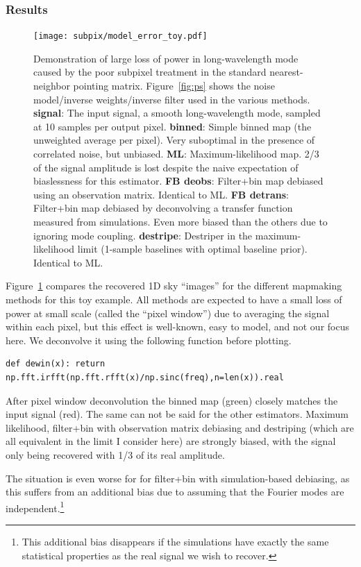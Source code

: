 \documentclass[twocolumn,apj]{aastex63}
\newcommand{\dfn}[1]{\textbf{#1}}
\begin{document}
\subsubsection{Results}
\begin{figure}
	\centering
	\texttt{[image: subpix/model\_error\_toy.pdf]}
	\caption{
		Demonstration of large loss of power in long-wavelength mode
		caused by the poor subpixel treatment in the standard nearest-neighbor pointing matrix.
		Figure~\ref{fig:ps} shows the noise model/inverse weights/inverse filter
		used in the various methods.
		\dfn{signal}: The input signal, a smooth long-wavelength mode,
		sampled at 10 samples per output pixel.
		\dfn{binned}: Simple binned map (the unweighted average per pixel).
		Very suboptimal in the presence of correlated noise, but unbiased.
		\dfn{ML}: Maximum-likelihood map. 2/3 of the signal amplitude is lost despite
		the naive expectation of biaslessness for this estimator.
		\dfn{FB deobs}: Filter+bin map debiased using an observation matrix.
		Identical to ML.
		\dfn{FB detrans}: Filter+bin map debiased by deconvolving a
		transfer function measured from simulations. Even more biased
		than the others due to ignoring mode coupling.
		\dfn{destripe}: Destriper in the maximum-likelihood limit
		(1-sample baselines with optimal baseline prior). Identical to ML.
	}
	\label{fig:subpix-bias}
\end{figure}

Figure~\ref{fig:subpix-bias} compares the recovered 1D sky ``images''
for the different mapmaking methods for this toy example. All methods
are expected to have a small loss of power at small scale (called
the ``pixel window'') due to averaging the signal within each pixel,
but this effect is well-known, easy to model, and not our focus here.
We deconvolve it using the following function before plotting.
\begin{lstlisting}
def dewin(x): return np.fft.irfft(np.fft.rfft(x)/np.sinc(freq),n=len(x)).real
\end{lstlisting}
After pixel window deconvolution the binned map (green) closely matches the
input signal (red). The same can not be said for the other estimators.
Maximum likelihood, filter+bin with observation matrix debiasing and destriping
(which are all equivalent in the limit I consider here) are strongly biased,
with the signal only being recovered with 1/3 of its real amplitude.

The situation is even worse for for filter+bin with simulation-based debiasing,
as this suffers from an additional bias due to assuming that the Fourier modes
are independent.\footnote{This additional bias disappears if the simulations
have exactly the same statistical properties as the real signal we wish to
recover.}
\end{document}
